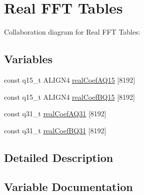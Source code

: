 \hypertarget{group__RealFFT__Table}{}\section{Real F\+FT Tables}
\label{group__RealFFT__Table}
Collaboration diagram for Real F\+FT Tables\+:
\subsection*{Variables}
\begin{DoxyCompactItemize}
\item 
const q15\+\_\+t A\+L\+I\+G\+N4 \hyperlink{group__RealFFT__Table_ga11e84d0ee257a547f749b37dd0078d36}{real\+Coef\+A\+Q15} \mbox{[}8192\mbox{]}
\item 
const q15\+\_\+t A\+L\+I\+G\+N4 \hyperlink{group__RealFFT__Table_gac871666f018b70938b2b98017628cb97}{real\+Coef\+B\+Q15} \mbox{[}8192\mbox{]}
\item 
const q31\+\_\+t \hyperlink{group__RealFFT__Table_gaf1592a6cf0504675205074a43c3728a2}{real\+Coef\+A\+Q31} \mbox{[}8192\mbox{]}
\item 
const q31\+\_\+t \hyperlink{group__RealFFT__Table_ga1eb5745728a61c3715755f5d69a4a960}{real\+Coef\+B\+Q31} \mbox{[}8192\mbox{]}
\end{DoxyCompactItemize}


\subsection{Detailed Description}


\subsection{Variable Documentation}
